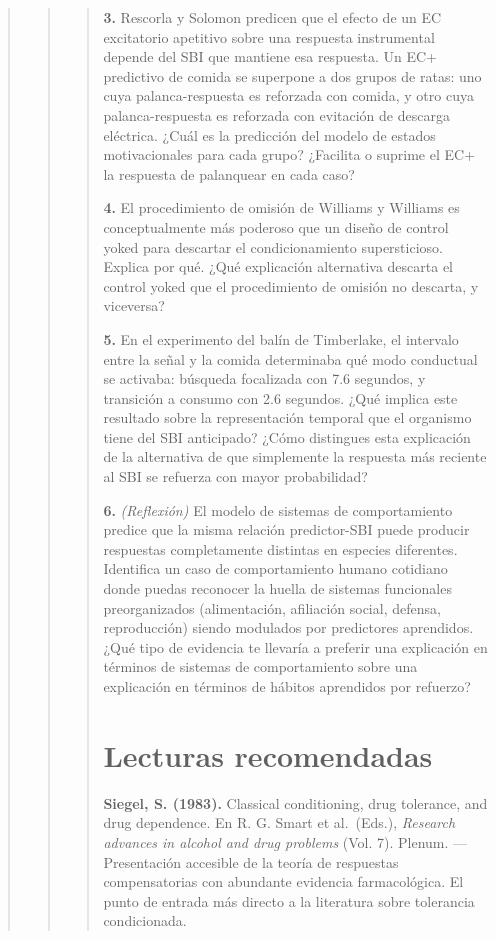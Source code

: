 \documentclass[
  letterpaper,
  DIV=11,
  numbers=noendperiod]{scrreprt}
\begin{document}
\begin{tcolorbox}[enhanced jigsaw, toprule=.15mm, arc=.35mm, colback=white, opacityback=0, colframe=quarto-callout-note-color-frame, breakable, rightrule=.15mm, left=2mm, leftrule=.75mm, bottomrule=.15mm]
\begin{quote}
\begin{quote}
\begin{quote}
\textbf{3.} Rescorla y Solomon predicen que el efecto de un EC
excitatorio apetitivo sobre una respuesta instrumental depende del SBI
que mantiene esa respuesta. Un EC+ predictivo de comida se superpone a
dos grupos de ratas: uno cuya palanca-respuesta es reforzada con comida,
y otro cuya palanca-respuesta es reforzada con evitación de descarga
eléctrica. ¿Cuál es la predicción del modelo de estados motivacionales
para cada grupo? ¿Facilita o suprime el EC+ la respuesta de palanquear
en cada caso?

\textbf{4.} El procedimiento de omisión de Williams y Williams es
conceptualmente más poderoso que un diseño de control yoked para
descartar el condicionamiento supersticioso. Explica por qué. ¿Qué
explicación alternativa descarta el control yoked que el procedimiento
de omisión no descarta, y viceversa?

\textbf{5.} En el experimento del balín de Timberlake, el intervalo
entre la señal y la comida determinaba qué modo conductual se activaba:
búsqueda focalizada con 7.6 segundos, y transición a consumo con 2.6
segundos. ¿Qué implica este resultado sobre la representación temporal
que el organismo tiene del SBI anticipado? ¿Cómo distingues esta
explicación de la alternativa de que simplemente la respuesta más
reciente al SBI se refuerza con mayor probabilidad?

\textbf{6.} \emph{(Reflexión)} El modelo de sistemas de comportamiento
predice que la misma relación predictor-SBI puede producir respuestas
completamente distintas en especies diferentes. Identifica un caso de
comportamiento humano cotidiano donde puedas reconocer la huella de
sistemas funcionales preorganizados (alimentación, afiliación social,
defensa, reproducción) siendo modulados por predictores aprendidos. ¿Qué
tipo de evidencia te llevaría a preferir una explicación en términos de
sistemas de comportamiento sobre una explicación en términos de hábitos
aprendidos por refuerzo?

\section{Lecturas recomendadas}\label{lecturas-recomendadas-4}

\textbf{Siegel, S. (1983).} Classical conditioning, drug tolerance, and
drug dependence. En R. G. Smart et al.~(Eds.), \emph{Research advances
in alcohol and drug problems} (Vol. 7). Plenum. --- Presentación
accesible de la teoría de respuestas compensatorias con abundante
evidencia farmacológica. El punto de entrada más directo a la literatura
sobre tolerancia condicionada.


\end{quote}
\end{quote}
\end{quote}
\end{tcolorbox}
\end{document}
